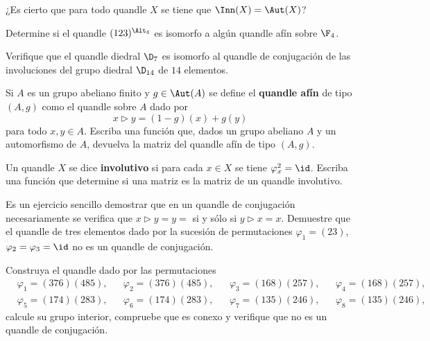 \begin{block}
	¿Es cierto que para todo quandle $X$ se tiene que $\Inn(X)=\Aut(X)$?
\end{block}

\begin{block}
	Determine si el quandle $(123)^{\Alt_4}$ es isomorfo a algún quandle afín
	sobre $\F_4$. 
\end{block}

\begin{block}
	Verifique que el quandle diedral $\D_{7}$ es
	isomorfo al quandle de conjugación de las involuciones del grupo diedral
	$\D_{14}$ de $14$ elementos.
\end{block}

\begin{block}
	Si $A$ es un grupo abeliano finito y $g\in\Aut(A)$ se define el
	\textbf{quandle afín} de tipo $(A,g)$ como el quandle sobre $A$ dado por
	\[
	x\triangleright y=(1-g)(x)+g(y)
	\]
	para todo $x,y\in A$. Escriba una función que, dados un grupo abeliano $A$
	y un automorfismo de $A$, devuelva la matriz del quandle afín de tipo
	$(A,g)$. 
\end{block}

\begin{block}
	Un quandle $X$ se dice \textbf{involutivo} si para cada $x\in X$ se tiene
	$\varphi_x^2=\id$.  Escriba una función que determine si una matriz es la
	matriz de un quandle involutivo. 
\end{block}

\begin{block}
\label{xca:conjugacion}
Es un ejercicio sencillo demostrar que en un quandle de conjugación
necesariamente se verifica que $x\triangleright y=y=$ si y sólo si
$y\triangleright x=x$.  Demuestre que el quandle de tres elementos dado por la
sucesión de permutaciones $\varphi_1=(23)$, $\varphi_2=\varphi_3=\id$ no es un
quandle de conjugación.
\end{block}

\begin{block}
	Construya el quandle dado por las permutaciones
	\begin{align*}
		&\varphi_1=(376)(485), && \varphi_2=(376)(485), && \varphi_3=(168)(257), && \varphi_4=(168)(257),\\
		&\varphi_5=(174)(283), && \varphi_6=(174)(283), && \varphi_7=(135)(246), && \varphi_8=(135)(246),
	\end{align*}
	calcule su grupo interior, compruebe que es conexo y verifique que no es un
	quandle de conjugación.
\end{block}




